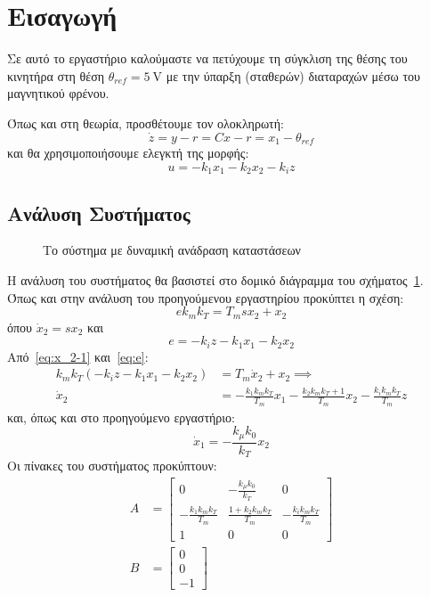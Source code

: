 \section{Εισαγωγή}
Σε αυτό το εργαστήριο καλούμαστε να πετύχουμε τη σύγκλιση της θέσης του κινητήρα στη θέση $\theta_{ref} = \SI{5}{\volt}$
με την ύπαρξη (σταθερών) διαταραχών μέσω του μαγνητικού φρένου.

Όπως και στη θεωρία, προσθέτουμε τον ολοκληρωτή:
\[\dot{z} = y - r = C x - r = x_1 - \theta_{ref}\]
και θα χρησιμοποιήσουμε ελεγκτή της μορφής:
\[u = -k_1 x_1 - k_2 x_2 - k_i z\]
\subsection{Ανάλυση Συστήματος}
\newcommand{\kone}{\frac{-k_m}{T_m s + 1}}
\newcommand{\ktwo}{k_{\mu}}
\newcommand{\kthree}{\frac{k_0}{s}}
\begin{figure}[htbp]
    \centering
    
    \caption{Το σύστημα με δυναμική ανάδραση καταστάσεων}\label{fig:system-feedback-dynamic}
\end{figure}
Η ανάλυση του συστήματος θα βασιστεί στο δομικό διάγραμμα του σχήματος~\ref{fig:system-feedback-dynamic}.
Όπως και στην ανάλυση του προηγούμενου εργαστηρίου προκύπτει η σχέση:
\begin{equation}
  \label{eq:x_2-1}
  e k_m k_T = T_m s x_2 + x_2
\end{equation}
όπου $\dot{x}_2 = s x_2$ και
\begin{equation}%
  \label{eq:e}
  e = - k_i z - k_1 x_1 - k_2 x_2
\end{equation}
Από~\ref{eq:x_2-1} και~\ref{eq:e}:
\begin{align*}
  k_m k_T (-k_i z - k_1 x_1 -k_2 x_2) &= T_m \dot{x}_2 + x_2 \implies\\
  \dot{x}_2 &= -\frac{k_1 k_m k_T}{T_m} x_1 -\frac{k_2 k_m k_T + 1}{T_m} x_2 - \frac{k_i k_m k_T}{T_m} z
\end{align*}
και, όπως και στο προηγούμενο εργαστήριο:
\begin{equation}
  \label{eq:x_1}
  \dot{x}_1 = -\frac{k_{\mu} k_0}{k_T} x_2
\end{equation}
Οι πίνακες του συστήματος προκύπτουν:
\begin{align}
  A & = \begin{bmatrix}
    0 & -\frac{k_{\mu} k_0}{k_T} & 0\\
    -\frac{k_1 k_m k_T}{T_m} & \frac{1 + k_2 k_m k_T}{T_m} & -\frac{k_i k_m k_T}{T_m}\\
    1 & 0 & 0
  \end{bmatrix} \\
  B & = \begin{bmatrix}
    0\\
    0\\
    -1
  \end{bmatrix}
\end{align}
